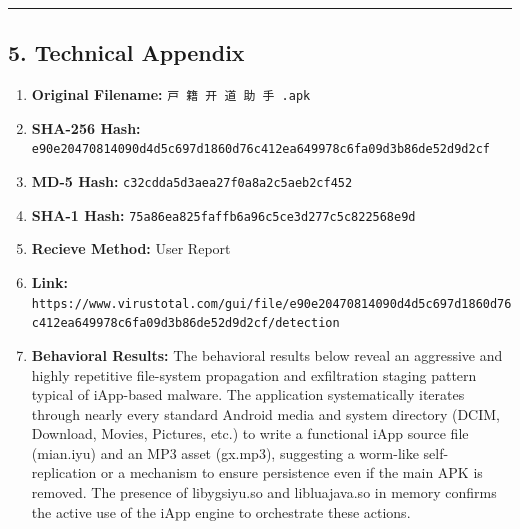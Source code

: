 \documentclass[
]{article}
\begin{document}
\begin{center}\rule{0.5\linewidth}{0.5pt}\end{center}

\subsection{\texorpdfstring{\textbf{5. Technical
Appendix}}{5. Technical Appendix}}\label{5-technical-appendix}

\begin{enumerate}
\def\labelenumi{\arabic{enumi}.}
\item
  \textbf{Original Filename:} \texttt{戸\ 籍\ 开\ 道\ 助\ 手\ .apk}
\item
  \textbf{SHA-256 Hash:}
  \texttt{e90e20470814090d4d5c697d1860d76c412ea649978c6fa09d3b86de52d9d2cf}
\item
  \textbf{MD-5 Hash:} \texttt{c32cdda5d3aea27f0a8a2c5aeb2cf452}
\item
  \textbf{SHA-1 Hash:} \texttt{75a86ea825faffb6a96c5ce3d277c5c822568e9d}
\item
  \textbf{Recieve Method:} User Report
\item
  \textbf{Link:}
  \texttt{https://www.virustotal.com/gui/file/e90e20470814090d4d5c697d1860d76c412ea649978c6fa09d3b86de52d9d2cf/detection}
\item
  \textbf{Behavioral Results:} The behavioral results below reveal an
  aggressive and highly repetitive file-system propagation and
  exfiltration staging pattern typical of iApp-based malware. The
  application systematically iterates through nearly every standard
  Android media and system directory (DCIM, Download, Movies, Pictures,
  etc.) to write a functional iApp source file (mian.iyu) and an MP3
  asset (gx.mp3), suggesting a worm-like self-replication or a mechanism
  to ensure persistence even if the main APK is removed. The presence of
  libygsiyu.so and libluajava.so in memory confirms the active use of
  the iApp engine to orchestrate these actions.
\end{enumerate}
\end{document}
